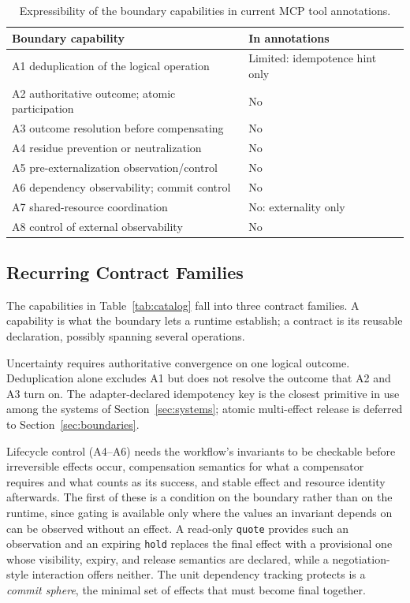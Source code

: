 \documentclass{article}
\begin{document}
\begin{table}[t]
\centering
\renewcommand{\arraystretch}{1.1}
\footnotesize
\caption{Expressibility of the boundary capabilities in current MCP tool
annotations.}
\label{tab:gap}
\begin{tabularx}{\linewidth}{@{}X l@{}}
\toprule
\textbf{Boundary capability} & \textbf{In annotations} \\
\midrule
A1 deduplication of the logical operation & Limited: idempotence hint only \\
A2 authoritative outcome; atomic participation & No \\
A3 outcome resolution before compensating & No \\
A4 residue prevention or neutralization & No \\
A5 pre-externalization observation/control & No \\
A6 dependency observability; commit control & No \\
A7 shared-resource coordination & No: externality only \\
A8 control of external observability & No \\
\bottomrule
\end{tabularx}
\end{table}


\subsection{Recurring Contract Families}

The capabilities in Table~\ref{tab:catalog} fall into three contract
families. A capability is what the boundary lets a runtime establish; a
contract is its reusable declaration, possibly spanning several
operations.

Uncertainty requires authoritative convergence on one logical outcome.
Deduplication alone excludes A1 but does not resolve the
outcome that A2 and A3 turn on. The adapter-declared idempotency key is the
closest primitive in use among the systems of Section~\ref{sec:systems};
atomic multi-effect release is deferred to
Section~\ref{sec:boundaries}.

Lifecycle control (A4--A6) needs the workflow's invariants to be checkable
before irreversible effects occur, compensation semantics for what a
compensator requires and what counts as its success, and stable effect and
resource identity afterwards. The first of these is a condition on the
boundary rather than on the runtime, since gating is available only where
the values an invariant depends on can be observed without an effect. A
read-only \texttt{quote} provides such an observation and an expiring
\texttt{hold} replaces the final effect with a provisional one whose
visibility, expiry, and release semantics are declared, while a
negotiation-style interaction offers neither. The unit dependency
tracking protects is a \emph{commit sphere}, the minimal set of effects that
must become final together.
\end{document}
